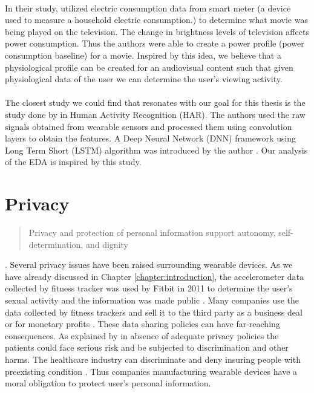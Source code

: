 \paragraph{} In their study, \citeauthor{greveler_multimedia_nodate} \cite{greveler_multimedia_nodate} utilized electric consumption data from smart meter (a device used to measure a household electric consumption.) to determine what movie was being played on the television. The change in brightness levels of television affects power consumption. Thus the authors were able to create a power profile (power consumption baseline) for a movie. Inspired by this idea, we believe that a physiological profile can be created for an audiovisual content such that given physiological data of the user we can determine the user's viewing activity.

\paragraph{} The closest study we could find that resonates with our goal for this thesis is the study done by \citeauthor{ordonez_deep_2016} in Human Activity Recognition (HAR). The authors used the raw signals obtained from wearable sensors and processed them using convolution layers to obtain the features. A Deep Neural Network (DNN) framework using Long Term Short (LSTM) algorithm was introduced by the author \cite{ordonez_deep_2016}. Our analysis of the EDA is inspired by this study. 

\section{Privacy} \blockquote{Privacy and protection of personal information support autonomy, self-determination, and dignity} \cite{hurley_taking_2014}. Several privacy issues have been raised surrounding wearable devices. As we have already discussed in Chapter \ref{chapter:introduction}, the accelerometer data collected by fitness tracker was used by Fitbit in 2011 to determine the user's sexual activity and the information was made public \cite{Fitbit}. Many companies use the data collected by fitness trackers and sell it to the third party as a business deal or for monetary profits \cite{ever_step_you_fake}. These data sharing policies can have far-reaching consequences. As explained by \citeauthor{montgomery_health_nodate} in absence of adequate privacy policies the patients could face serious risk and be subjected to discrimination and other harms. The healthcare industry can discriminate and deny insuring people with preexisting condition \cite{montgomery_health_nodate}. Thus companies manufacturing wearable devices have a moral obligation to protect user's personal information.

